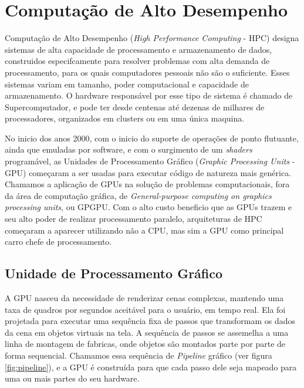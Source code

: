 \section{Computação de Alto Desempenho}\label{GPGPU}

    Computação de Alto Desempenho (\textit{High Performance Computing} - HPC)
designa sistemas de alta capacidade de processamento e armazenamento de dados,
construidos especifcamente para resolver problemas com alta demanda de processamento,
para os quais computadores pessoais não são o suficiente. Esses sistemas variam
em tamanho, poder computacional e capacidade de armazenamento. O hardware
responsável por esse tipo de sistema é chamado de Supercomputador, e pode ter
desde centenas até dezenas de milhares de processadores, organizados em clusters
ou em uma única maquina.

    No inicio dos anos 2000, com o inicio do suporte de operações de ponto flutuante,
ainda que emuladas por software, e com o surgimento de um \textit{shaders} programável,
as Unidades de Processamento Gráfico (\textit{Graphic Processing Units} - GPU)
começaram a ser usadas para executar código de natureza mais genérica.
Chamamos a aplicação de GPUs na solução de problemas computacionais,
fora da área de computação gráfica, de
\textit{General-purpose computing on graphics processing units}, ou GPGPU.
Com o alto custo beneficio que as GPUs trazem e seu alto poder de realizar
processamento paralelo, arquiteturas de HPC começaram a aparecer utilizando não a
CPU, mas sim a GPU como principal carro chefe de processamento.

\subsection{Unidade de Processamento Gráfico}\label{GPU}
    A GPU nasceu da necessidade de renderizar cenas complexas, mantendo uma taxa de quadros por segundos
aceitável para o usuário, em tempo real. Ela foi projetada para executar uma sequência fixa de passos que transformam
os dados da cena em objetos virtuais na tela. A sequência de passos se assemelha a uma linha de montagem de fabricas,
onde objetos são montados parte por parte de forma sequencial. Chamamos essa sequência de \textit{Pipeline} gráfico
(ver figura \ref{fig:pipeline}), e a GPU é construída para que cada passo dele seja mapeado para uma ou mais partes do
seu hardware.

